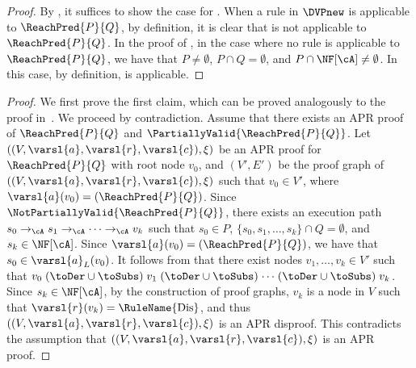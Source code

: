 \PropUniquenessOfApplicableRulesInCDVPnew*
\begin{proof}
	By , it suffices to show the case for .
	When a rule in $\DVPnew$ is applicable to $\ReachPred{P}{Q}$, by definition, it is clear that  is not applicable to $\ReachPred{P}{Q}$.
	In the proof of , in the case where no rule is applicable to $\ReachPred{P}{Q}$, we have that $P \ne \emptyset$, $P \cap Q = \emptyset$, and $P \cap \NF[\cA] \ne \emptyset$.
	In this case, by definition,  is applicable.
\end{proof}

\ThmSoundnessOfAPRProofs*
\begin{proof}
	We first prove the first claim, which can be proved analogously to the proof in~\cite[Theorem~3]{CL18}.
	We proceed by contradiction.
	Assume that there exists an APR proof of $\ReachPred{P}{Q}$ and
	$\PartiallyValid{\ReachPred{P}{Q}}$.
	Let $((V,\varsl{a},\varsl{r},\varsl{c}),\xi)$ be an APR proof for $\ReachPred{P}{Q}$ with root node $v_0$, and $(V',E')$ be the proof graph of $((V,\varsl{a},\varsl{r},\varsl{c}),\xi)$ such that $v_0 \in V'$,
	where $\varsl{a}(v_0) = (\ReachPred{P}{Q})$.
	Since
	$\NotPartiallyValid{\ReachPred{P}{Q}}$,
	there exists an execution path $s_0 \to_\cA s_1 \to_\cA \cdots \to_\cA v_k$ such that
	$s_0 \in P$, $\{s_0,s_1,\ldots,s_k\} \cap Q = \emptyset$, and $s_k \in \NF[\cA]$.
	Since $\varsl{a}(v_0) = (\ReachPred{P}{Q})$, we have that $s_0 \in \varsl{a}_L(v_0)$.
	It follows from  that
	there exist nodes $v_1,\ldots,v_k \in V'$ such that
	$v_0 \mathrel{(\toDer \cup \toSubs)}
		v_1 \mathrel{(\toDer \cup \toSubs)}
		\cdots
		\mathrel{(\toDer \cup \toSubs)}
		v_k$.
	Since $s_k \in \NF[\cA]$, by the construction of proof graphs, $v_k$ is a node in $V$ such that $\varsl{r}(v_k) = \mbox{\rm\RuleName{Dis}}$, and thus $((V,\varsl{a},\varsl{r},\varsl{c}),\xi)$ is an APR disproof.
	This contradicts the assumption that $((V,\varsl{a},\varsl{r},\varsl{c}),\xi)$ is an APR proof.


\end{proof}
